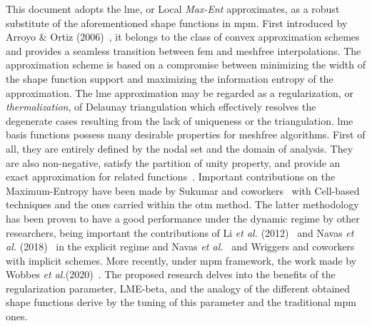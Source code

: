 \documentclass[preprint,12pt,a4paper]{elsarticle}
\begin{document}
This document adopts the \acrfull{lme}, or Local \textit{Max-Ent} approximates, as a robust substitute of the aforementioned shape functions in \acrshort{mpm}. First introduced by Arroyo \& Ortiz
(2006)~\cite{Arroyo2006}, it belongs to the class of convex 
approximation schemes and provides a seamless transition between
\acrshort{fem} and meshfree interpolations. The
approximation scheme is based on a compromise between minimizing the
width of the shape function support and maximizing the information
entropy of the approximation. The \acrshort{lme} approximation
may be regarded as a regularization, or \textit{thermalization}, of
Delaunay triangulation which effectively resolves the degenerate cases
resulting from the lack of uniqueness or the triangulation. \acrshort{lme} basis functions possess many desirable properties for
meshfree algorithms. First of all, they are entirely defined by the
nodal set and the domain of analysis. They are also non-negative,
satisfy the partition of unity property, and provide an exact
approximation for related functions~\cite{Arroyo2006}. Important contributions on the Maximum-Entropy have been made by Sukumar and coworkers~\cite{Sukumar15} with Cell-based techniques and the ones carried within the \acrfull{otm} method. The latter methodology has been proven to have a good performance under
the dynamic regime by other researchers, being important the contributions of Li {\it et al.} (2012)~\cite{Li2012} and Navas {\it et al.}
(2018)~\cite{Navas:17b,Navas2018a} in the explicit regime and Navas
{\it et al.}~\cite{Navas2016,Navas2016b,Navas:17c} and Wriggers and
coworkers~\cite{Wriggers18} with implicit schemes. More
recently, under \acrshort{mpm} framework, the work made by Wobbes {\it et
  al.}(2020)~\cite{Wobbes2020}. The proposed research delves into the benefits of
the regularization parameter, \gls{LME-beta}, and the analogy of the different obtained shape functions derive by the tuning of this parameter and the traditional \acrshort{mpm} ones.
\end{document}
